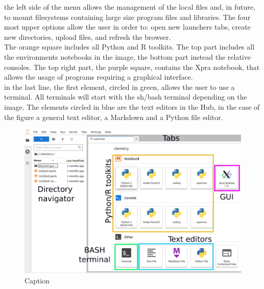 \documentclass[a4paper,11pt]{article}
\begin{document}
the left side of the menu allows the management of the local files and, in future, to mount filesystems containing large size program files and libraries. The four most upper options allow the user in order to: open new launchers tabs, create new directories, upload files, and refresh the browser. \\

The orange square includes all Python and R toolkits. The top part includes all the environments notebooks in the image, the bottom part instead the relative consoles. The top right part, the purple square, contains the Xpra notebook, that allows the usage of programs requiring a graphical interface.  \\

in the last line, the first element, circled in green, allows the user to use a terminal. All terminals will start with the sh/bash terminal depending on the image. The elements circled in blue are the text editors in the Hub,  in the case of the figure a general text editor, a Markdown and a Python file editor. \\ 


\begin{figure}[!ht]
    \centering
    \includegraphics[width=0.8\linewidth]{uninuvola.pdf}
    \caption{Caption}
    \label{fig:uninuvola_main_page}
\end{figure}
\end{document}
